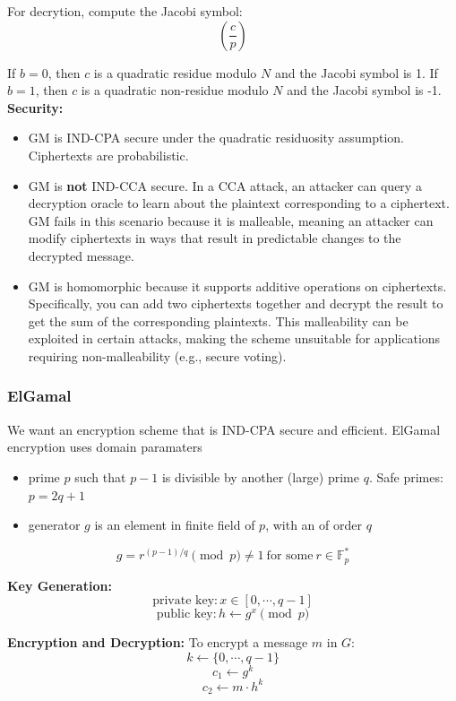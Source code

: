 For decrytion, compute the Jacobi symbol:
\[ \left(\frac{c}{p}\right) \]

If $b = 0$, then $c$ is a quadratic residue modulo $N$ and the Jacobi symbol is 1.
If $b = 1$, then $c$ is a quadratic non-residue modulo $N$ and the Jacobi symbol is -1. \\

\textbf{Security:}
\begin{itemize}
    \item GM is IND-CPA secure under the quadratic residuosity assumption. Ciphertexts are probabilistic.
    \item GM is \textbf{not} IND-CCA secure. In a CCA attack, an attacker can query a decryption oracle to learn about the plaintext corresponding to a ciphertext. 
    GM fails in this scenario because it is malleable, meaning an attacker can modify ciphertexts in ways that result in predictable changes to the decrypted message.
    \item GM is homomorphic because it supports additive operations on ciphertexts. Specifically, you can add two ciphertexts together and decrypt the result to get the sum of the corresponding plaintexts. 
    This malleability can be exploited in certain attacks, making the scheme unsuitable for applications requiring non-malleability (e.g., secure voting).
\end{itemize}

\subsubsection{ElGamal}
We want an encryption scheme that is IND-CPA secure and efficient.
ElGamal encryption uses domain paramaters
\begin{itemize}
    \item prime $p$ such that $p-1$ is divisible by another (large) prime $q$.
    Safe primes: $p = 2q + 1$
    \item generator $g$ is an element in finite field of $p$, with an of order $q$
\end{itemize}

\[ g = r^{(p-1)/q} \pmod{p} \neq 1 \ \text{for some} \ r \in \mathbb{F}_p^*\]

\textbf{Key Generation:}
\[ \text{private key}:  x \in [0, \cdots, q-1] \]
\[ \text{public key}: h \leftarrow g^x \pmod{p} \]

\textbf{Encryption and Decryption:}
To encrypt a message $m$ in $G$:    
\[ k \leftarrow \{0, \cdots, q-1\} \] 
\[ c_1 \leftarrow  g^k \]
\[ c_2 \leftarrow  m \cdot h^k \]

